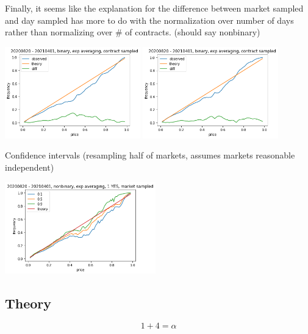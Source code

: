 \documentclass[
]{article}
\begin{document}
Finally, it seems like the explanation for the difference between market
sampled and day sampled has more to do with the normalization over
number of days rather than normalizing over \# of contracts. (should say
nonbinary)

\includegraphics[width=\textwidth,height=1.5625in]{all_nonbinary_contract_sampled.png}
\includegraphics[width=\textwidth,height=1.5625in]{pos_nonbinary_contract_sampled.png}

Confidence intervals (resampling half of markets, assumes markets
reasonable independent)

\includegraphics[width=\textwidth,height=1.5625in]{pos_nonbinary_market_sampled_conf.png}

\hypertarget{theory}{%
\subsection{Theory}\label{theory}}

$$1 + 4 = \alpha$$
\end{document}
